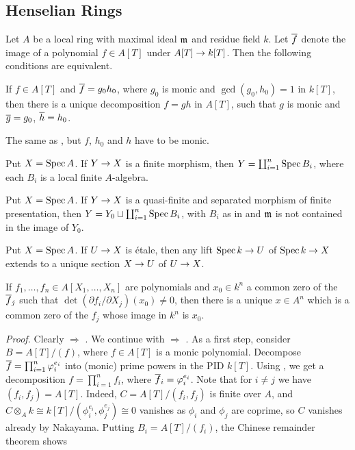 \subsection{Henselian Rings}
\begin{prop}\label{prop:henselian}
	Let $A$ be a local ring with maximal ideal $\mathfrak{m}$ and residue field $k$. Let $\ov{f}$ denote the image of a polynomial $f\in A[T]$ under $A[T]\morphism k[T]$. Then the following conditions are equivalent.
	\begin{alphanumerate}
		\item If $f\in A[T]$ and $\ov{f}=g_0h_0$, where $g_0$ is monic and $\gcd(g_0,h_0)=1$ in $k[T]$, then there is a unique decomposition $f=gh$ in $A[T]$, such that $g$ is monic and $\ov{g}=g_0$, $\ov{h}=h_0$.
		\item The same as , but $f$, $h_0$ and $h$ have to be monic.
		\item Put $X=\operatorname{Spec} A$. If $Y\morphism X$ is a finite morphism, then $Y=\coprod_{i=1}^n\operatorname{Spec} B_i$, where each $B_i$ is a local finite $A$-algebra.
		\item Put $X=\operatorname{Spec} A$. If $Y\morphism X$ is a quasi-finite and separated morphism of finite presentation, then $Y=Y_0\sqcup\coprod_{i=1}^n\operatorname{Spec} B_i$, with $B_i$ as in  and $\mathfrak{m}$ is not contained in the image of $Y_0$.
		\item Put $X=\operatorname{Spec} A$. If $U\morphism X$ is étale, then any lift $\Spec k\morphism U$ of $\Spec k\morphism X$ extends to a unique section $X\morphism U$ of $U\morphism X$.
		\item If $f_1,\dotsc,f_n\in A[X_1,\dotsc,X_n]$ are polynomials and $x_0\in k^n$ a common zero of the $\ov{f}_j$ such that $\det(\partial f_i/\partial X_j)(x_0)\neq 0$, then there is a unique $x\in A^n$ which is a common zero of the $f_j$ whose image in $k^n$ is $x_0$.
	\end{alphanumerate}
\end{prop}
	\noindent\emph{Proof.} Clearly  $\Rightarrow$ . We continue with  $\Rightarrow$ . As a first step, consider $B=A[T]/(f)$, where $f\in A[T]$ is a monic polynomial. Decompose $\ov{f}=\prod_{i=1}^n\phi_i^{e_i}$ into (monic) prime powers in the PID $k[T]$. Using , we get a decomposition $f=\prod_{i=1}^nf_i$, where $\ov{f}_i=\phi_i^{e_i}$. Note that for $i\neq j$ we have $(f_i,f_j)=A[T]$. Indeed, $C=A[T]/(f_i,f_j)$ is finite over $A$, and $C\otimes_Ak\cong k[T]/(\phi_i^{e_i},\phi_j^{e_j})\cong 0$ vanishes as $\phi_i$ and $\phi_j$ are coprime, so $C$ vanishes already by Nakayama. Putting $B_i=A[T]/(f_i)$, the Chinese remainder theorem shows
